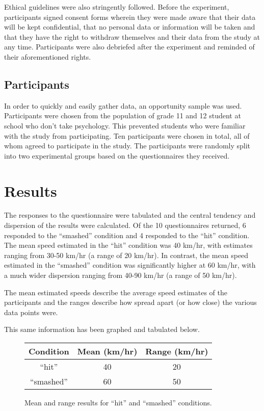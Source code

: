 \documentclass[a4paper,twocolumn]{report}
\begin{document}
Ethical guidelines were also stringently followed. Before the experiment,
participants signed consent forms wherein they were made aware that their
data will be kept confidential, that no personal data or information will
be taken and that they have the right to withdraw themselves and their data
from the study at any time. Participants were also debriefed after the
experiment and reminded of their aforementioned rights.

\subsection{Participants}

In order to quickly and easily gather data, an opportunity sample was used.
Participants were chosen from the population of grade 11 and 12 student at
school who don’t take psychology. This prevented students who were familiar
with the study from participating. Ten participants were chosen in total,
all of whom agreed to participate in the study. The participants were
randomly split into two experimental groups based on the questionnaires
they received.

\section{Results}

The responses to the questionnaire were tabulated and the central tendency
and dispersion of the results were calculated. Of the 10 questionnaires
returned, 6 responded to the “smashed” condition and 4 responded to the
“hit” condition. The mean speed estimated in the “hit” condition was 40
km/hr, with estimates ranging from 30-50 km/hr (a range of 20 km/hr).
In contrast, the mean speed estimated in the “smashed” condition was
significantly higher at 60 km/hr, with a much wider dispersion ranging from
40-90 km/hr (a range of 50 km/hr).

The mean estimated speeds describe the average speed estimates of the
participants and the ranges describe how spread apart (or how close)
the various data points were.

This same information has been graphed and tabulated below.

\begin{figure}[h]
\begin{center}
\begin{tabular}{ccc}
\toprule
Condition & Mean (km/hr) & Range (km/hr)\\
\midrule
“hit” & 40 & 20\\
“smashed” & 60 & 50\\
\bottomrule
\end{tabular}
\end{center}
\caption{Mean and range results for “hit” and “smashed” conditions.}
\end{figure}
\end{document}

